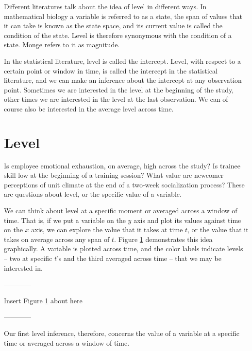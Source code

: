 \documentclass[]{article}
\title{}
\author{}
\date{}
\begin{document}
Different literatures talk about the idea of level in different ways. In
mathematical biology a variable is referred to as a state, the span of
values that it can take is known as the state space, and its current
value is called the condition of the state. Level is therefore
synonymous with the condition of a state. Monge refers to it as
magnitude.

In the statistical literature, level is called the intercept. Level,
with respect to a certain point or window in time, is called the
intercept in the statistical literature, and we can make an inference
about the intercept at any observation point. Sometimes we are
interested in the level at the beginning of the study, other times we
are interested in the level at the last observation. We can of course
also be interested in the average level across time.

\hypertarget{level}{%
\section{Level}\label{level}}

Is employee emotional exhaustion, on average, high across the study? Is
trainee skill low at the beginning of a training session? What value are
newcomer perceptions of unit climate at the end of a two-week
socialization process? These are questions about level, or the specific
value of a variable.

We can think about level at a specific moment or averaged across a
window of time. That is, if we put a variable on the \(y\) axis and plot
its values against time on the \(x\) axis, we can explore the value that
it takes at time \(t\), or the value that it takes on average across any
span of \(t\). Figure \ref{level} demonstrates this idea graphically. A
variable is plotted across time, and the color labels indicate levels --
two at specific \(t\)'s and the third averaged across time -- that we
may be interested in.

\begin{center}

------------

Insert Figure \ref{level} about here

------------

\end{center}

\noindent Our first level inference, therefore, concerns the value of a
variable at a specific time or averaged across a window of time.
\end{document}
